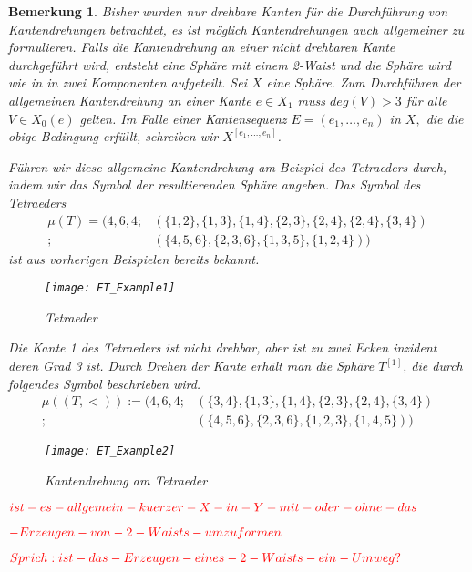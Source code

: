 \documentclass[12pt,titlepage,twoside,cleardoublepage]{article}
\theoremstyle{nummermitklammern}
\newtheorem{bemerkung}[temp]{Bemerkung}
\newtheorem{bemerkung}[zahl]{Bemerkung}
\numberwithin{equation}{section}
\begin{document}
\begin{bemerkung}
Bisher wurden nur drehbare Kanten für die Durchführung von Kantendrehungen betrachtet, es ist möglich Kantendrehungen auch allgemeiner zu formulieren. Falls die Kantendrehung an einer nicht drehbaren Kante durchgeführt wird, entsteht eine Sphäre mit einem 2-Waist und die Sphäre wird wie in  in zwei Komponenten aufgeteilt. 
Sei $X$ eine Sphäre. Zum Durchführen der allgemeinen Kantendrehung an einer Kante $e\in X_1$ muss $deg(V)>3$ für alle $V\in X_0(e)$ gelten. Im Falle einer Kantensequenz $E=(e_1,\ldots,e_n)$ in $X,$ die die obige Bedingung erfüllt, schreiben wir $X^{[e_1,\ldots,e_n]}$.

 Führen wir diese allgemeine Kantendrehung am Beispiel des Tetraeders durch, indem wir das Symbol der resultierenden Sphäre angeben. Das Symbol des Tetraeders
\begin{align*}
\mu(T)=(4,6,4;&(\{1,2\}, \{1,3\},\{1,4\},\{2,3\},\{2,4\},\{2,4\},\{3,4\})\\
;&(\{4,5,6\},\{2,3,6\},\{1,3,5\},\{1,2,4\}))
\end{align*} ist aus vorherigen Beispielen bereits bekannt.
\begin{figure}[H]
\begin{center}
\texttt{[image: ET\_Example1]}
\end{center}
\caption{Tetraeder}
\end{figure}
Die Kante 1 des Tetraeders ist nicht drehbar, aber ist zu zwei Ecken inzident deren Grad 3 ist. Durch Drehen der Kante erhält man die Sphäre $T^{[1]}$, die durch folgendes Symbol beschrieben wird.
\begin{align*}
\mu ((T,<)):=(4,6,4;&(\{3,4\},\{1,3\},\{1,4\},\{2,3\},\{2,4\},\{3,4\})\\
;&(\{4,5,6\},\{2,3,6\},\{1,2,3\},\{1,4,5\}))
\end{align*}
\begin{figure}[H]
\begin{center}
\texttt{[image: ET\_Example2]}
\end{center}
\caption{Kantendrehung am Tetraeder}
\end{figure}

\end{bemerkung}


$\textcolor{red}{ist-es-allgemein-kuerzer-X-in-Y-mit-oder-ohne-das}$

$\textcolor{red}{-Erzeugen-von-2-Waists-umzuformen}$

$\textcolor{red}{Sprich:ist-das-Erzeugen-eines-2-Waists-ein-Umweg?}$
\end{document}
